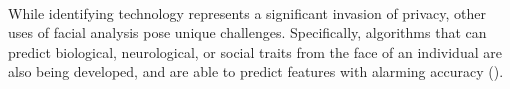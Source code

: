 \documentclass{article}
\begin{document}
\vspace{0.3cm} \\
While identifying technology represents a significant invasion of privacy, other uses of facial analysis pose unique challenges. Specifically, algorithms that can predict biological, neurological, or social traits from the face of an individual are also being developed, and are able to predict features with alarming accuracy (\cite{conde2024five}).   

\end{document}
